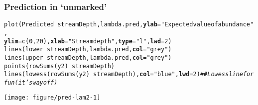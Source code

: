 \documentclass[color=usenames,dvipsnames]{beamer}\usepackage[]{graphicx}\usepackage[]{xcolor}
\makeatletter
\newcommand{\hlnum}[1]{\textcolor[rgb]{0.69,0.494,0}{#1}}%
\newcommand{\hlsng}[1]{\textcolor[rgb]{0.749,0.012,0.012}{#1}}%
\newcommand{\hlcom}[1]{\textcolor[rgb]{0.514,0.506,0.514}{\textit{#1}}}%
\newcommand{\hlopt}[1]{\textcolor[rgb]{0,0,0}{#1}}%
\newcommand{\hldef}[1]{\textcolor[rgb]{0,0,0}{#1}}%
\newcommand{\hlkwc}[1]{\textcolor[rgb]{0,0,0}{\textbf{#1}}}%
\newcommand{\hlkwd}[1]{\textcolor[rgb]{0.004,0.004,0.506}{#1}}%
\newenvironment{kframe}{%
 \def\at@end@of@kframe{}%
 \ifinner\ifhmode%
  \def\at@end@of@kframe{\end{minipage}}%
  \begin{minipage}{\columnwidth}%
 \fi\fi%
 \def\FrameCommand##1{\hskip\@totalleftmargin \hskip-\fboxsep
 \colorbox{shadecolor}{##1}\hskip-\fboxsep
     \hskip-\linewidth \hskip-\@totalleftmargin \hskip\columnwidth}%
 \MakeFramed {\advance\hsize-\width
   \@totalleftmargin\z@ \linewidth\hsize
   \@setminipage}}%
 {\par\unskip\endMakeFramed%
 \at@end@of@kframe}
\newenvironment{knitrout}{}{} %
\makeatother
\begin{document}
\begin{frame}[fragile]
  \frametitle{Prediction in `unmarked'}
\begin{knitrout}\tiny
{}\color{fgcolor}\begin{kframe}
\begin{alltt}
\hlkwd{plot}\hldef{(Predicted} \hlopt{~} \hldef{streamDepth, lambda.pred,} \hlkwc{ylab}\hldef{=}\hlsng{"Expected value of abundance"}\hldef{,}
     \hlkwc{ylim}\hldef{=}\hlkwd{c}\hldef{(}\hlnum{0}\hldef{,}\hlnum{20}\hldef{),} \hlkwc{xlab}\hldef{=}\hlsng{"Stream depth"}\hldef{,} \hlkwc{type}\hldef{=}\hlsng{"l"}\hldef{,} \hlkwc{lwd}\hldef{=}\hlnum{2}\hldef{)}
\hlkwd{lines}\hldef{(lower} \hlopt{~} \hldef{streamDepth, lambda.pred,} \hlkwc{col}\hldef{=}\hlsng{"grey"}\hldef{)}
\hlkwd{lines}\hldef{(upper} \hlopt{~} \hldef{streamDepth, lambda.pred,} \hlkwc{col}\hldef{=}\hlsng{"grey"}\hldef{)}
\hlkwd{points}\hldef{(}\hlkwd{rowSums}\hldef{(y2)}\hlopt{~}\hldef{streamDepth)}
\hlkwd{lines}\hldef{(}\hlkwd{lowess}\hldef{(}\hlkwd{rowSums}\hldef{(y2)}\hlopt{~}\hldef{streamDepth),} \hlkwc{col}\hldef{=}\hlsng{"blue"}\hldef{,} \hlkwc{lwd}\hldef{=}\hlnum{2}\hldef{)}  \hlcom{## Lowess line for fun (it's way off)}
\end{alltt}
\end{kframe}

{\centering \texttt{[image: figure/pred-lam2-1]} 

}


\end{knitrout}
\end{frame}







\end{document}
